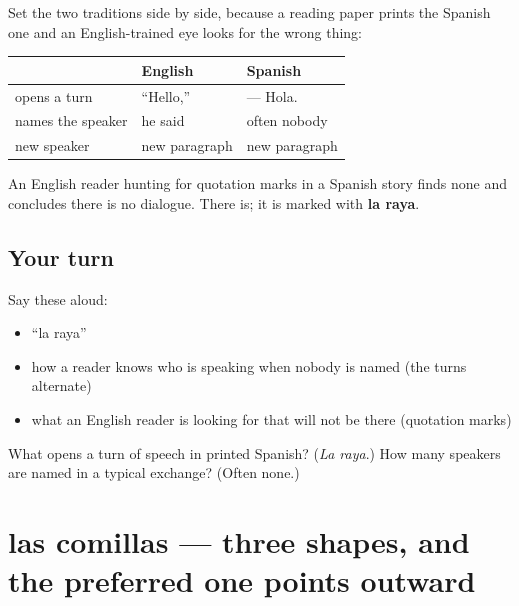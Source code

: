 \begin{grammarlens}[title={Grammar Lens: what replaces the quotation marks}]
Set the two traditions side by side, because a reading paper prints the Spanish one and an English-trained eye looks for the wrong thing:

\noindent
\begin{tabularx}{\linewidth}{@{}>{\raggedright\arraybackslash}X>{\raggedright\arraybackslash}X>{\raggedright\arraybackslash}X@{}}
\toprule
\textbf{} & \textbf{English} & \textbf{Spanish} \\
\midrule
opens a turn & \textquotedblleft{}Hello,\textquotedblright{} & — Hola. \\
names the speaker & he said & often nobody \\
new speaker & new paragraph & new paragraph \\
\bottomrule
\end{tabularx}

An English reader hunting for quotation marks in a Spanish story finds none and concludes there is no dialogue. There is; it is marked with \textbf{la raya}.
\end{grammarlens}

\subsection*{Your turn}
Say these aloud:

\begin{itemize}
\raggedright
  \item \textquotedblleft{}la raya\textquotedblright{}
  \item how a reader knows who is speaking when nobody is named (the turns alternate)
  \item what an English reader is looking for that will not be there (quotation marks)
\end{itemize}

\begin{tcolorbox}[breakable,colback=teal!4,colframe=teal!35!black,title={Before you move on}]
What opens a turn of speech in printed Spanish? (\emph{La raya}.) How many speakers are named in a typical exchange? (Often none.)
\end{tcolorbox}
\section[las comillas]{las comillas — three shapes, and the preferred one points outward}

